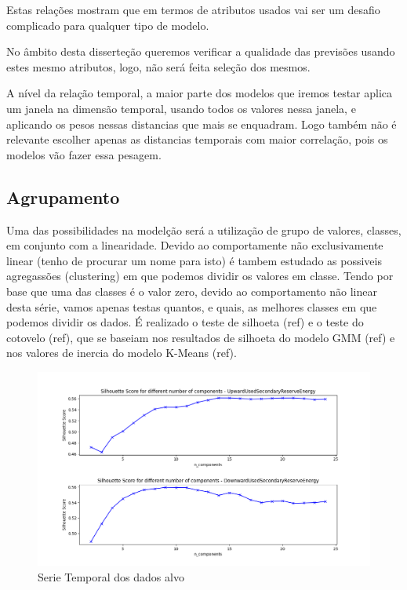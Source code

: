 Estas relações mostram que em termos de atributos usados vai ser um desafio complicado para qualquer tipo de modelo.

No âmbito desta disserteção queremos verificar a qualidade das previsões usando estes mesmo atributos, logo, não será feita seleção dos mesmos.

A nível da relação temporal, a maior parte dos modelos que iremos testar aplica um janela na dimensão temporal, usando todos os valores nessa janela, e aplicando os pesos nessas distancias que mais se enquadram. Logo também não é relevante escolher apenas as distancias temporais com maior correlação, pois os modelos vão fazer essa pesagem.

\subsection{Agrupamento \label{se:clustering}}

Uma das possibilidades na modelção será a utilização de grupo de valores, classes, em conjunto com a linearidade.
Devido ao comportamente não exclusivamente linear (tenho de procurar um nome para isto) é tambem estudado as possiveis agregassões (clustering) em que podemos dividir os valores em classe.
Tendo por base que uma das classes é o valor zero, devido ao comportamento não linear desta série, vamos apenas testas quantos, e quais, as melhores classes em que podemos dividir os dados.
É realizado o teste de silhoeta (ref) e o teste do cotovelo (ref), que se baseiam nos resultados de silhoeta do modelo GMM (ref) e nos valores de inercia do modelo K-Means (ref). 

\begin{figure}[H]
  \centering
  \includegraphics[width=\textwidth]{../plots/silhouette_score.png}
  \caption{Serie Temporal dos dados alvo}
\end{figure}


